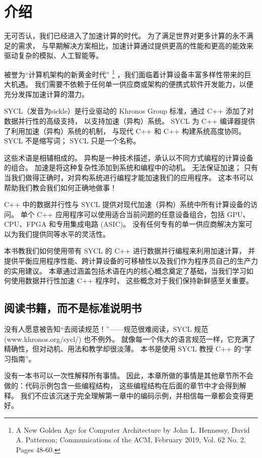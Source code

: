 \section{介绍}
无可否认，我们已经进入了加速计算的时代。 为了满足世界对更多计算的永不满足的需求，
与早期解决方案相比，加速计算通过提供更高的性能和更高的能效来驱动复杂的模拟、人工智能等。

被誉为“计算机架构的新黄金时代”
\footnote{A New Golden Age for Computer Architecture by John L. Hennessy, David A. Patterson; Communications of the ACM, February 2019, Vol. 62 No. 2, Pages 48-60.}
，我们面临着计算设备丰富多样性带来的巨大机遇。 
我们需要不依赖于任何单一供应商或架构的便携式软件开发能力，以便充分发挥加速计算的潜力。

SYCL（发音为sickle）是行业驱动的 Khronos Group 标准，通过 C++ 添加了对数据并行性的高级支持，
以支持加速（异构）系统。 SYCL 为 C++ 编译器提供了利用加速（异构）系统的机制，
与现代 C++ 和 C++ 构建系统高度协同。 SYCL 不是缩写词； SYCL 只是一个名称。

\begin{remark}[加速 vs 异构]
	这些术语是相辅相成的。 异构是一种技术描述，承认以不同方式编程的计算设备的组合。 
	加速是将这种复杂性添加到系统和编程中的动机。 无法保证加速； 
	只有当我们做得正确时，对异构系统进行编程才能加速我们的应用程序。 这本书可以帮助我们教会我们如何正确地做事！
\end{remark}

C++ 中的数据并行性与 SYCL 提供对现代加速（异构）系统中所有计算设备的访问。 
单个 C++ 应用程序可以使用适合当前问题的任意设备组合，包括 GPU、CPU、FPGA 和专用集成电路 (ASIC)。 
没有任何专有的单一供应商解决方案可以为我们提供同等水平的灵活性。

本书教我们如何使用带有 SYCL 的 C++ 进行数据并行编程来利用加速计算，
并提供平衡应用程序性能、跨计算设备的可移植性以及我们作为程序员自己的生产力的实用建议。 
本章通过涵盖包括术语在内的核心概念奠定了基础，当我们学习如何使用数据并行性加速 C++ 程序时，
这些概念对于我们保持新鲜感至关重要。


\subsection{阅读书籍，而不是标准说明书}
没有人愿意被告知“去阅读规范！”——规范很难阅读，SYCL 规范 (www.khronos.org/sycl/) 也不例外。 
就像每一个伟大的语言规范一样，它充满了精确性，但对动机、用法和教学却很淡薄。 本书是使用 SYCL 教授 C++ 的“学习指南”。

没有一本书可以一次性解释所有事情。 因此，本章所做的事情是其他章节所不会做的：代码示例包含一些编程结构，
这些编程结构在后面的章节中才会得到解释。 我们不应该沉迷于完全理解第一章中的编码示例，并相信每一章都会变得更好。

